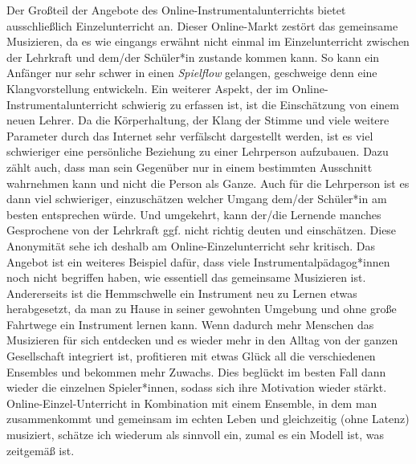 Der Großteil der Angebote des Online-Instrumentalunterrichts bietet
ausschließlich Einzelunterricht an. Dieser Online-Markt zestört das gemeinsame
Musizieren, da es wie eingangs erwähnt nicht einmal im Einzelunterricht zwischen
der Lehrkraft und dem/der Schüler*in zustande kommen kann. So kann ein Anfänger
nur sehr schwer in einen \emph{Spielflow} gelangen, geschweige denn eine
Klangvorstellung entwickeln. Ein weiterer Aspekt, der im
Online-Instrumentalunterricht schwierig zu erfassen ist, ist die Einschätzung
von einem neuen Lehrer. Da die Körperhaltung, der Klang der Stimme und viele
weitere Parameter durch das Internet sehr verfälscht dargestellt werden, ist es
viel schwieriger eine persönliche Beziehung zu einer Lehrperson aufzubauen. Dazu
zählt auch, dass man sein Gegenüber nur in einem bestimmten Ausschnitt
wahrnehmen kann und nicht die Person als Ganze. Auch für die Lehrperson ist es
dann viel schwieriger, einzuschätzen welcher Umgang dem/der Schüler*in am besten
entsprechen würde. Und umgekehrt, kann der/die Lernende manches Gesprochene von
der Lehrkraft ggf. nicht richtig deuten und einschätzen. Diese Anonymität sehe
ich deshalb am Online-Einzelunterricht sehr kritisch. Das Angebot ist ein
weiteres Beispiel dafür, dass viele Instrumentalpädagog*innen noch nicht
begriffen haben, wie essentiell das gemeinsame Musizieren ist. Andererseits ist
die Hemmschwelle ein Instrument neu zu Lernen etwas herabgesetzt, da man zu
Hause in seiner gewohnten Umgebung und ohne große Fahrtwege ein Instrument
lernen kann. Wenn dadurch mehr Menschen das Musizieren für sich entdecken und es
wieder mehr in den Alltag von der ganzen Gesellschaft integriert ist,
profitieren mit etwas Glück all die verschiedenen Ensembles und bekommen mehr
Zuwachs. Dies beglückt im besten Fall dann wieder die einzelnen Spieler*innen,
sodass sich ihre Motivation wieder stärkt. Online-Einzel-Unterricht in
Kombination mit einem Ensemble, in dem man zusammenkommt und gemeinsam im echten
Leben und gleichzeitig (ohne Latenz) musiziert, schätze ich wiederum als
sinnvoll ein, zumal es ein Modell ist, was zeitgemäß ist. 

